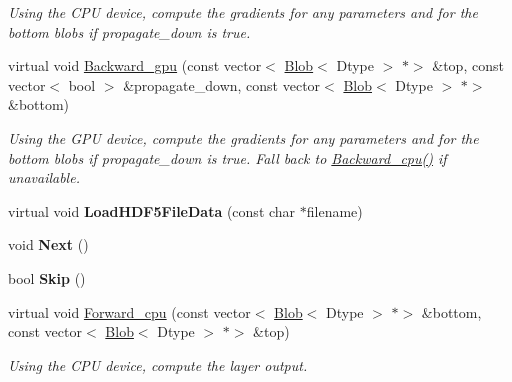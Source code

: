 \begin{DoxyCompactItemize}
\begin{DoxyCompactList}\small\item\em Using the C\+PU device, compute the gradients for any parameters and for the bottom blobs if propagate\+\_\+down is true. \end{DoxyCompactList}\item 
\mbox{\label{classcaffe_1_1_h_d_f5_data_layer_af8bba12ab79b135944ab57ac58ff2128}} 
virtual void \mbox{\hyperlink{classcaffe_1_1_h_d_f5_data_layer_af8bba12ab79b135944ab57ac58ff2128}{Backward\+\_\+gpu}} (const vector$<$ \mbox{\hyperlink{classcaffe_1_1_blob}{Blob}}$<$ Dtype $>$ $\ast$$>$ \&top, const vector$<$ bool $>$ \&propagate\+\_\+down, const vector$<$ \mbox{\hyperlink{classcaffe_1_1_blob}{Blob}}$<$ Dtype $>$ $\ast$$>$ \&bottom)
\begin{DoxyCompactList}\small\item\em Using the G\+PU device, compute the gradients for any parameters and for the bottom blobs if propagate\+\_\+down is true. Fall back to \mbox{\hyperlink{classcaffe_1_1_h_d_f5_data_layer_ab2a3379c83003ab3fa19848fbc57d30a}{Backward\+\_\+cpu()}} if unavailable. \end{DoxyCompactList}\item 
\mbox{\label{classcaffe_1_1_h_d_f5_data_layer_a6fe59cc631f26f3323641ea480352119}} 
virtual void {\bfseries Load\+H\+D\+F5\+File\+Data} (const char $\ast$filename)
\item 
\mbox{\label{classcaffe_1_1_h_d_f5_data_layer_a06dd19f9e75448e649bd6d1bdf628879}} 
void {\bfseries Next} ()
\item 
\mbox{\label{classcaffe_1_1_h_d_f5_data_layer_ad8fcb05eb70f5230d34b4dc1e641bc7b}} 
bool {\bfseries Skip} ()
\item 
\mbox{\label{classcaffe_1_1_h_d_f5_data_layer_a463d0842f80b5081e84115e78a7e2447}} 
virtual void \mbox{\hyperlink{classcaffe_1_1_h_d_f5_data_layer_a463d0842f80b5081e84115e78a7e2447}{Forward\+\_\+cpu}} (const vector$<$ \mbox{\hyperlink{classcaffe_1_1_blob}{Blob}}$<$ Dtype $>$ $\ast$$>$ \&bottom, const vector$<$ \mbox{\hyperlink{classcaffe_1_1_blob}{Blob}}$<$ Dtype $>$ $\ast$$>$ \&top)
\begin{DoxyCompactList}\small\item\em Using the C\+PU device, compute the layer output. \end{DoxyCompactList}\item 

\end{DoxyCompactItemize}
